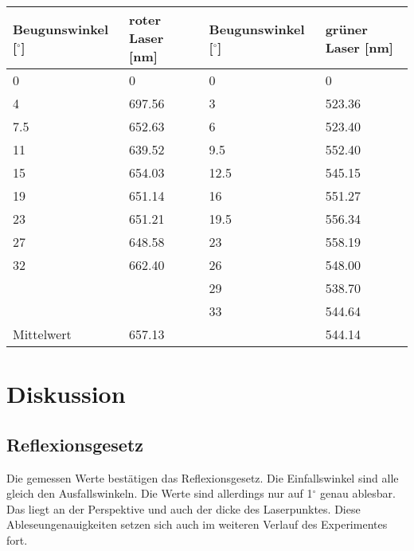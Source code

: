 \begin{minipage}{\linewidth}
    \begin{table}[H]
        \centering
    \begin{tabular}{llll}
        \toprule
        Beugunswinkel [$^\circ$] & roter Laser [nm] & Beugunswinkel [$^\circ$] & grüner Laser [nm]  \\
        \midrule
        0   & 0    & 0     & 0    \\
        4 & 697.56 & 3 & 523.36 \\
        7.5 & 652.63 & 6 & 523.40\\
        11  & 639.52 & 9.5 & 552.40 \\
        15 & 654.03 & 12.5 & 545.15 \\
        19 & 651.14 & 16 & 551.27\\
        23  & 651.21  & 19.5  & 556.34  \\
        27 & 648.58 & 23 & 558.19 \\
        32 & 662.40 & 26 & 548.00 \\
           &        & 29 & 538.70\\
           &        & 33 & 544.64 \\
        \midrule
        Mittelwert & 657.13 & & 544.14\\
        \bottomrule   
    \end{tabular}
    
    \label{tab:9}
\end{table}
\end{minipage}

\section{Diskussion}

\subsection{Reflexionsgesetz}

Die gemessen Werte bestätigen das Reflexionsgesetz. Die Einfallswinkel sind alle gleich den Ausfallswinkeln. Die Werte sind allerdings nur auf 1$^\circ$ genau ablesbar. Das liegt an der Perspektive und auch der dicke des Laserpunktes. Diese Ableseungenauigkeiten setzen sich auch im weiteren Verlauf des Experimentes fort.

